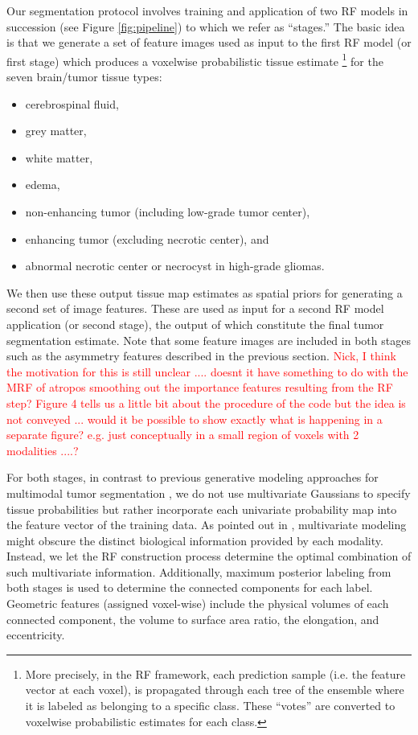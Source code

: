 \documentclass[preprint,authoryear,review,12pt]{elsarticle}
\begin{document}
Our segmentation protocol involves training and application
of two RF models in succession 
(see Figure \ref{fig:pipeline}) to which we refer as ``stages.''  The basic idea is that
we generate a set of feature images used as input to the
first RF model (or first stage) which produces a voxelwise 
probabilistic tissue estimate%
\footnote{
More precisely, in the RF framework, each prediction sample (i.e. the feature vector at each voxel),
is propagated through each tree of the ensemble where it is labeled as belonging to a specific
class.  These ``votes'' are converted to voxelwise probabilistic estimates for each class.
}
 for the seven brain/tumor tissue types:
\begin{itemize}
\item cerebrospinal fluid,
\item grey matter,
\item white matter,
\item edema, 
\item non-enhancing tumor (including low-grade tumor center), 
\item enhancing tumor (excluding necrotic center), and 
\item abnormal necrotic center or necrocyst in high-grade gliomas.
\end{itemize}
We then use these output tissue map estimates as spatial 
priors for generating a second set of image features.  These
are used as input for a second RF model application (or
second stage),
the output of which constitute the final tumor segmentation estimate.
Note that some feature images are included in both stages such as
the asymmetry features described in the previous section.
\textcolor{red}{Nick, I think the motivation for this is still unclear
  .... doesnt it have something to do with the MRF of atropos
  smoothing out the importance features resulting from the RF step?
  Figure 4 tells us a little bit about the procedure of the code but
  the idea is not conveyed ... would it be possible to show exactly
  what is happening in a separate figure?  e.g. just conceptually in a small 
  region of voxels with 2 modalities ....?}

For both stages, in contrast to previous generative
modeling approaches for multimodal tumor segmentation 
\citep[e.g.,][]{prastawa2003}, we do not use multivariate 
Gaussians to specify tissue probabilities but rather incorporate each
univariate probability map into the feature vector of the training
data.  As pointed out in \cite{menze2010}, multivariate modeling
might obscure the distinct biological information provided by each 
modality.  Instead, we let the RF construction 
process determine the optimal combination of such multivariate
information.  Additionally, maximum posterior labeling from both stages
is used to determine the connected components for each label.  
Geometric features (assigned voxel-wise) include the physical volumes 
of each connected component, the volume to surface area ratio, 
the elongation, and eccentricity. 
\end{document}
